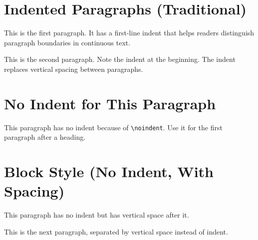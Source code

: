 \documentclass[12pt, a4paper]{article}
\begin{document}
\section*{Indented Paragraphs (Traditional)}
This is the first paragraph. It has a first-line indent that helps
readers distinguish paragraph boundaries in continuous text.

This is the second paragraph. Note the indent at the beginning.
The indent replaces vertical spacing between paragraphs.

\section*{No Indent for This Paragraph}
\noindent This paragraph has no indent because of \texttt{\textbackslash noindent}.
Use it for the first paragraph after a heading.

\section*{Block Style (No Indent, With Spacing)}
\setlength{\parindent}{0pt}
\setlength{\parskip}{\baselineskip}

This paragraph has no indent but has vertical space after it.

This is the next paragraph, separated by vertical space instead of indent.
\end{document}
